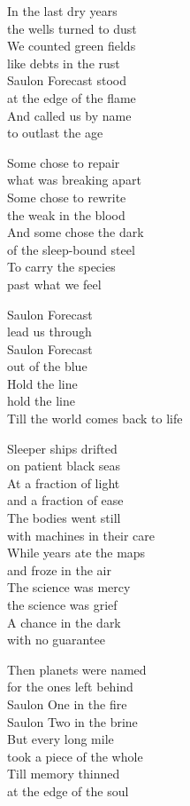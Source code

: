\begin{lyrics}
In the last dry years\\
the wells turned to dust\\
We counted green fields\\
like debts in the rust\\
Saulon Forecast stood\\
at the edge of the flame\\
And called us by name\\
to outlast the age

Some chose to repair\\
what was breaking apart\\
Some chose to rewrite\\
the weak in the blood\\
And some chose the dark\\
of the sleep-bound steel\\
To carry the species\\
past what we feel

Saulon Forecast\\
lead us through\\
Saulon Forecast\\
out of the blue\\
Hold the line\\
hold the line\\
Till the world comes back to life

Sleeper ships drifted\\
on patient black seas\\
At a fraction of light\\
and a fraction of ease\\
The bodies went still\\
with machines in their care\\
While years ate the maps\\
and froze in the air\\
The science was mercy\\
the science was grief\\
A chance in the dark\\
with no guarantee

Then planets were named\\
for the ones left behind\\
Saulon One in the fire\\
Saulon Two in the brine\\
But every long mile\\
took a piece of the whole\\
Till memory thinned\\
at the edge of the soul


\end{lyrics}
